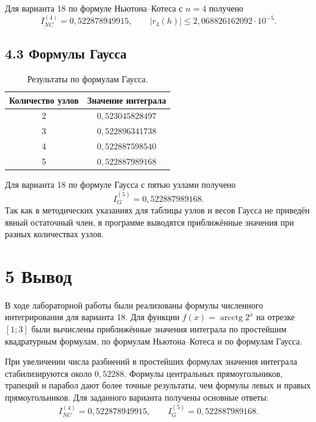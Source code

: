 \documentclass[14pt,a4paper]{extarticle}
\begin{document}
Для варианта 18 по формуле Ньютона--Котеса с $n=4$ получено
\[
    I_{NC}^{(4)}=0{,}522878949915,
    \qquad |r_4(h)|\leq2{,}068826162092\cdot10^{-5}.
\]

\subsection*{4.3 Формулы Гаусса}

\begin{table}[H]
\centering
\caption{Результаты по формулам Гаусса.}
\small
\begin{tabular}{|c|c|}
\hline
Количество узлов & Значение интеграла \\ \hline
2 & $0{,}523045828497$ \\ \hline
3 & $0{,}522896341738$ \\ \hline
4 & $0{,}522887598540$ \\ \hline
5 & $0{,}522887989168$ \\ \hline
\end{tabular}
\end{table}

Для варианта 18 по формуле Гаусса с пятью узлами получено
\[
    I_G^{(5)}=0{,}522887989168.
\]
Так как в методических указаниях для таблицы узлов и весов Гаусса не приведён явный остаточный член, в программе выводятся приближённые значения при разных количествах узлов.

\newpage

\section*{5 Вывод}
В ходе лабораторной работы были реализованы формулы численного интегрирования для варианта 18. Для функции $f(x)=\operatorname{arcctg}2^x$ на отрезке $[1;3]$ были вычислены приближённые значения интеграла по простейшим квадратурным формулам, по формулам Ньютона--Котеса и по формулам Гаусса.

При увеличении числа разбиений в простейших формулах значения интеграла стабилизируются около $0{,}52288$. Формулы центральных прямоугольников, трапеций и парабол дают более точные результаты, чем формулы левых и правых прямоугольников. Для заданного варианта получены основные ответы:
\[
    I_{NC}^{(4)}=0{,}522878949915,
    \qquad
    I_G^{(5)}=0{,}522887989168.
\]

\newpage
\end{document}
